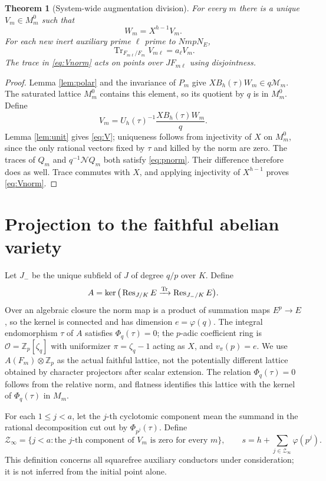 \documentclass[11pt]{article}
\newtheorem{theorem}{Theorem}[section]
\theoremstyle{definition}\newtheorem{definition}[theorem]{Definition}
\theoremstyle{remark}\newtheorem{remark}[theorem]{Remark}
\newcommand{\Zp}{\mathbb Z_p}\newcommand{\Qp}{\mathbb Q_p}
\newcommand{\OO}{\mathcal O}\newcommand{\Tr}{\operatorname{Tr}}
\begin{document}
\begin{theorem}[System-wide augmentation division]\label{thm:division}
For every $m$ there is a unique $V_m\in M_m^0$ such that
\begin{equation}\label{eq:V}
 W_m=X^{h-1}V_m.
\end{equation}
For each new inert auxiliary prime $\ell$ prime to $Nm p N_E$,
\begin{equation}\label{eq:Vnorm}
 \Tr_{F_{m\ell}/F_m} V_{m\ell}=a_\ell V_m.
\end{equation}
The trace in \eqref{eq:Vnorm} acts on points over $JF_{m\ell}$ using disjointness.
\end{theorem}
\begin{proof}
Lemma \ref{lem:polar} and the invariance of $P_m$ give $XB_h(\tau)W_m\in q\mathcal M_m$. The saturated lattice $M_m^0$ contains this element, so its quotient by $q$ is in $M_m^0$. Define
\[
 V_m=U_h(\tau)^{-1}\frac{XB_h(\tau)W_m}{q}.
\]
Lemma \ref{lem:unit} gives \eqref{eq:V}; uniqueness follows from injectivity of $X$ on $M_m^0$, since the only rational vectors fixed by $\tau$ and killed by the norm are zero. The traces of $Q_m$ and $q^{-1}\mathcal NQ_m$ both satisfy \eqref{eq:pnorm}. Their difference therefore does as well. Trace commutes with $X$, and applying injectivity of $X^{h-1}$ proves \eqref{eq:Vnorm}.
\end{proof}

\section{Projection to the faithful abelian variety}
Let $J_-$ be the unique subfield of $J$ of degree $q/p$ over $K$. Define
\[
 A=\ker\big(\Res_{J/K}E\xrightarrow{\Tr}\Res_{J_-/K}E\big).
\]
Over an algebraic closure the norm map is a product of summation maps $E^p\to E$, so the kernel is connected and has dimension $e=\varphi(q)$. The integral endomorphism $\tau$ of $A$ satisfies $\Phi_q(\tau)=0$; the $p$-adic coefficient ring is $\OO=\Zp[\zeta_q]$ with uniformizer $\pi=\zeta_q-1$ acting as $X$, and $v_\pi(p)=e$. We use $A(F_m)\otimes\Zp$ as the actual faithful lattice, not the potentially different lattice obtained by character projectors after scalar extension. The relation $\Phi_q(\tau)=0$ follows from the relative norm, and flatness identifies this lattice with the kernel of $\Phi_q(\tau)$ in $M_m$.

For each $1\le j<a$, let the $j$-th cyclotomic component mean the summand in the rational decomposition cut out by $\Phi_{p^j}(\tau)$. Define
\[
 \mathcal Z_\infty=\{j<a:\text{the $j$-th component of $V_m$ is zero for every }m\},
 \qquad s=h+\sum_{j\in\mathcal Z_\infty}\varphi(p^j).
\]
This definition concerns all squarefree auxiliary conductors under consideration; it is not inferred from the initial point alone.
\end{document}
